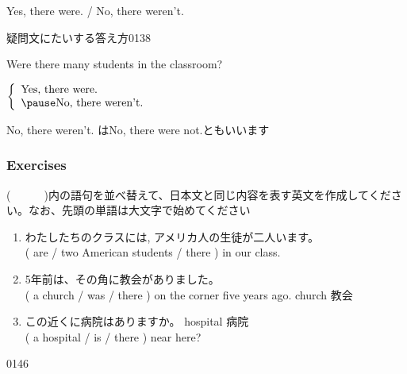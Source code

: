 \documentclass[aspectratio=169,xcolor={dvipsnames,table}]{beamer}
\newcommand{\myaudio}[1]{\href{#1}{\faVolumeUp}}
\begin{document}
 \begin{frame}[plain]{Yes, there were. / No, there weren't.}
 \Large

疑問文にたいする答え方\hfill{\tiny 0138}\,{\scriptsize \myaudio{./audio/001_there_is_12.mp3}}
\vspace{10pt}

\pause

Were there many students in the classroom?

\pause

$\left\{\begin{array}{l}
	 \text{Yes, there were.}\\\pause
         \text{No, there weren't.}
	\end{array}\right.$

\pause

\mbox{}\hfill{}{\small No, there weren't. はNo, there were not.ともいいます}
\end{frame}
\begin{frame}[plain]\frametitle{Exercises}

{\small (~~~~~~)内の語句を並べ替えて、日本文と同じ内容を表す英文を作成してください。なお、先頭の単語は大文字で始めてください}

  \begin{enumerate}
   \item {\small わたしたちのクラスには,
アメリカ人の生徒が二人います。}\\
         ( are / two American students / there ) in our class.\\
            \item {\small 5年前は、その角に教会がありました。}\\
         ( a church / was / there ) on the corner five years ago.%
\hfill{\scriptsize church  教会}\\
            \item {\small この近くに病院はありますか。}%
\hfill{\scriptsize hospital  病院}\\
         ( a hospital / is / there ) near here?\\
  \end{enumerate}
\hfill{\tiny 0146}\,{\scriptsize \myaudio{./audio/001_there_is_13.mp3}}
\end{frame}
\end{document}
